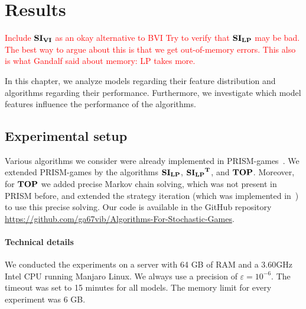 \chapter{Results} \label{ch:results}

\textcolor{red}{Include $\mathbf{SI_{VI}}$ as an okay alternative to BVI}
\textcolor{red}{Try to verify that $\mathbf{SI_{LP}}$ may be bad. The best way to argue about this is that we get out-of-memory errors. This also is what Gandalf said about memory: LP takes more.}

In this chapter, we analyze models regarding their feature distribution and algorithms regarding their performance.
Furthermore, we investigate which model features influence the performance of the algorithms.



\section{Experimental setup}
Various algorithms we consider were already implemented in PRISM-games~\cite{prismgames3}.
We extended PRISM-games by the algorithms $\mathbf{SI_{LP}}$, $\mathbf{\mathbf{SI_{LP}}^T}$, and $\mathbf{TOP}$.
Moreover, for $\mathbf{TOP}$ we added precise Markov chain solving, which was not present in PRISM before, and extended the strategy iteration (which was implemented in~\cite{gandalf}) to use this precise solving.
Our code is available in the GitHub repository \url{https://github.com/ga67vib/Algorithms-For-Stochastic-Games}.

\subsubsection*{Technical details}
We conducted the experiments on a server with 64 GB of RAM and a 3.60GHz Intel CPU running Manjaro Linux. %
We always use a precision of $\varepsilon=10^{-6}$. The timeout was set to 15 minutes for all models. 
The memory limit for every experiment was 6 GB.

